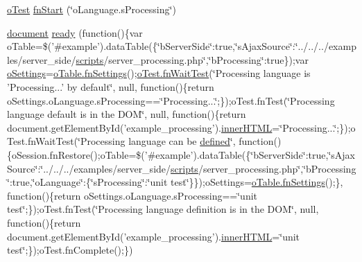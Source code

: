 \begin{DoxyCompactItemize}
\item 
\hyperlink{unit__test_8js_a3b2d259e2df3b6860d9047a92d09d0d6}{o\+Test} \hyperlink{4__server-side_2o_language_8s_processing_8js_a5277c3b4829dd6b02efef690393cb7c7}{fn\+Start} (\char`\"{}o\+Language.\+s\+Processing\char`\"{})
\item 
\hyperlink{outside_events_8js_aa14f8e0338cced6720590fd2ea13bd4b}{document} \hyperlink{4__server-side_2o_language_8s_processing_8js_a9c3481ed879bfbe230846493849a51ad}{ready} (function()\{var o\+Table=\$('\#example').data\+Table(\{\char`\"{}b\+Server\+Side\char`\"{}\+:true,\char`\"{}s\+Ajax\+Source\char`\"{}\+:\char`\"{}../../../examples/server\+\_\+side/\hyperlink{tinymce_8jquery_8dev_8js_a09066d4d580eeec222f858d588b4cdef}{scripts}/server\+\_\+processing.\+php\char`\"{},\char`\"{}b\+Processing\char`\"{}\+:true\});var \hyperlink{model_8settings_8js_a4857b9c813b4dea010668e9555d0aca7}{o\+Settings}=\hyperlink{api_8methods_8js_a78f387fab92a85c2cb7830bc5d8a6141}{o\+Table.\+fn\+Settings}();\hyperlink{onhold_24__server-side_2__zero__config_8js_ab25c4d596771c0133cdc45178ce72c3d}{o\+Test.\+fn\+Wait\+Test}(\char`\"{}Processing language is 'Processing...' by default\char`\"{}, null, function()\{return o\+Settings.\+o\+Language.\+s\+Processing==\char`\"{}Processing...\char`\"{};\});o\+Test.\+fn\+Test(\char`\"{}Processing language default is in the D\+O\+M\char`\"{}, null, function()\{return document.\+get\+Element\+By\+Id('example\+\_\+processing').\hyperlink{jquery-ui_8js_a87f73c4f0391c1cf9fe60374a76d9a7b}{inner\+H\+T\+M\+L}=\char`\"{}Processing...\char`\"{};\});o\+Test.\+fn\+Wait\+Test(\char`\"{}Processing language can be \hyperlink{tinymce_8js_a8cb6212cde9926d156ab5912c9b547cf}{defined}\char`\"{}, function()\{o\+Session.\+fn\+Restore();o\+Table=\$('\#example').data\+Table(\{\char`\"{}b\+Server\+Side\char`\"{}\+:true,\char`\"{}s\+Ajax\+Source\char`\"{}\+:\char`\"{}../../../examples/server\+\_\+side/\hyperlink{tinymce_8jquery_8dev_8js_a09066d4d580eeec222f858d588b4cdef}{scripts}/server\+\_\+processing.\+php\char`\"{},\char`\"{}b\+Processing\char`\"{}\+:true,\char`\"{}o\+Language\char`\"{}\+:\{\char`\"{}s\+Processing\char`\"{}\+:\char`\"{}unit test\char`\"{}\}\});o\+Settings=\hyperlink{api_8methods_8js_a78f387fab92a85c2cb7830bc5d8a6141}{o\+Table.\+fn\+Settings}();\}, function()\{return o\+Settings.\+o\+Language.\+s\+Processing==\char`\"{}unit test\char`\"{};\});o\+Test.\+fn\+Test(\char`\"{}Processing language definition is in the D\+O\+M\char`\"{}, null, function()\{return document.\+get\+Element\+By\+Id('example\+\_\+processing').\hyperlink{jquery-ui_8js_a87f73c4f0391c1cf9fe60374a76d9a7b}{inner\+H\+T\+M\+L}=\char`\"{}unit test\char`\"{};\});o\+Test.\+fn\+Complete();\})
\end{DoxyCompactItemize}


